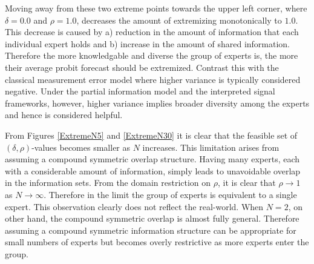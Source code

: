 \documentclass[11pt,twoside]{article}
\theoremstyle{definition}
\theoremstyle{definition}
\begin{document}
Moving away from these two extreme points towards the upper left corner, where $\delta = 0.0$ and $\rho = 1.0$, decreases the amount of extremizing monotonically to $1.0$. This decrease is caused by a) reduction in the amount of information that each individual expert holds and b) increase in the amount of shared information. Therefore the more knowledgable and diverse the group of experts is, the more their average probit forecast should be extremized. Contrast this with the classical measurement error model where higher variance is typically considered negative. Under the partial information model and the interpreted signal frameworks, however, higher variance implies broader diversity among the experts and hence is considered helpful. 

From Figures \ref{ExtremeN5} and \ref{ExtremeN30} it is clear that the feasible set of $(\delta, \rho)$-values becomes smaller as $N$ increases. This limitation arises from assuming a compound symmetric overlap structure. Having many experts, each with a considerable amount of information, simply leads to unavoidable overlap in the information sets. From the domain restriction on $\rho$, it is clear that $\rho \to 1$ as $N \to \infty$. Therefore in the limit the group of experts is equivalent to a single expert. This observation clearly does not reflect the real-world. When $N = 2$, on other hand, the compound symmetric overlap is almost fully general. Therefore assuming a compound symmetric information structure can be appropriate for small numbers of experts but becomes overly restrictive as more experts enter the group. 

\end{document}
